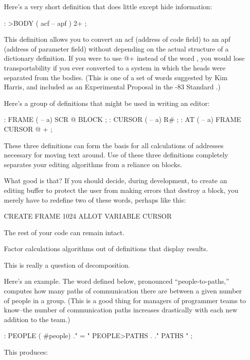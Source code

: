 Here's a very short definition that does little except hide information:

\begin{Code}
: >BODY  ( acf -- apf )  2+ ;
\end{Code}
This definition allows you to convert an acf (address of code field) to
an apf (address of parameter field) without depending on the actual
structure of a dictionary definition. If you were to use @+ instead of
the word , you would lose transportability if you ever
converted to a \Forth{} system in which the heads were separated from
the bodies. (This is one of a set of words suggested by Kim Harris,
and included as an Experimental Proposal in the \Forth{}-83 Standard
\cite{harris83}.)

Here's a group of definitions that might be used in writing an editor:

\begin{Code}
: FRAME  ( -- a)  SCR @ BLOCK ;
: CURSOR  ( -- a)  R# ;
: AT  ( -- a)  FRAME  CURSOR @ + ;
\end{Code}
These three definitions can form the basis for all calculations of
addresses necessary for moving text around. Use of these three
definitions completely separates your editing algorithms from a
reliance on \Forth{} blocks.

What good is that? If you should decide, during development, to create
an editing buffer to protect the user from making errors that destroy
a block, you merely have to redefine two of these words, perhaps like
this:

\begin{Code}
CREATE FRAME  1024 ALLOT
VARIABLE CURSOR
\end{Code}
The rest of your code can remain intact. 

\begin{tip}
Factor calculations algorithms out of definitions that display results.
\end{tip}
This is really a question of decomposition.

Here's an example. The word defined below, pronounced
``people-to-paths,'' computes how many paths of communication there are
between a given number of people in a group. (This is a good thing for
managers of programmer teams to know--the number of communication
paths increases drastically with each new addition to the team.)

\begin{Code}
: PEOPLE  ( #people)
    ." = "  PEOPLE>PATHS  .  ." PATHS " ;
\end{Code}
This produces:

